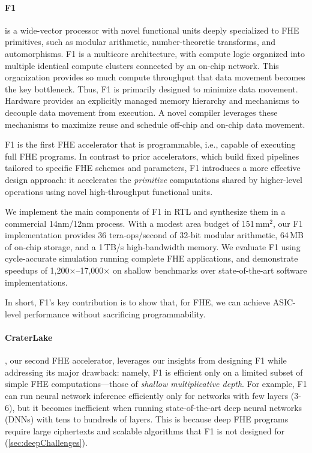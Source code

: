 \paragraph{F1} is a wide-vector processor with novel functional units deeply
specialized to FHE primitives, such as modular arithmetic, number-theoretic
transforms, and automorphisms. F1 is a multicore architecture, with compute
logic organized into multiple identical compute clusters connected by an
on-chip network. This organization provides so much compute throughput that
data movement becomes the key bottleneck. Thus, F1 is primarily designed to
minimize data movement. Hardware provides an explicitly managed memory
hierarchy and mechanisms to decouple data movement from execution. A novel
compiler leverages these mechanisms to maximize reuse and schedule off-chip and
on-chip data movement.

F1 is the first FHE accelerator that is programmable, i.e., capable of executing
full FHE programs. In contrast to prior accelerators, which build fixed pipelines
tailored to specific FHE schemes and parameters, F1 introduces a more effective
design approach: it accelerates the \emph{primitive} computations shared by
higher-level operations using novel high-throughput functional units.

We implement the main components of F1 in RTL and synthesize them in a
commercial 14nm/12nm process. With a modest area budget of 151\,mm$^2$, our F1
implementation provides 36 tera-ops/second of 32-bit modular arithmetic, 64\,MB
of on-chip storage, and a 1\,TB/s high-bandwidth memory. We evaluate F1 using
cycle-accurate simulation running complete FHE applications, and demonstrate
speedups of 1,200$\times$--17,000$\times$ on shallow benchmarks over
state-of-the-art software implementations.

In short, F1's key contribution is to show that, for FHE, we can achieve
ASIC-level performance without sacrificing programmability.


\paragraph{CraterLake}, our second FHE accelerator, leverages our insights from
designing F1 while addressing its major drawback: namely, F1 is efficient only
on a limited subset of simple FHE computations---those of \emph{shallow
multiplicative depth}. For example, F1 can run neural network inference
efficiently only for networks with few layers (3-6), but it becomes inefficient
when running state-of-the-art deep neural networks (DNNs) with tens to hundreds
of layers.
This is because deep FHE programs require large ciphertexts and scalable
algorithms that F1 is not designed for (\autoref{sec:deepChallenges}).

